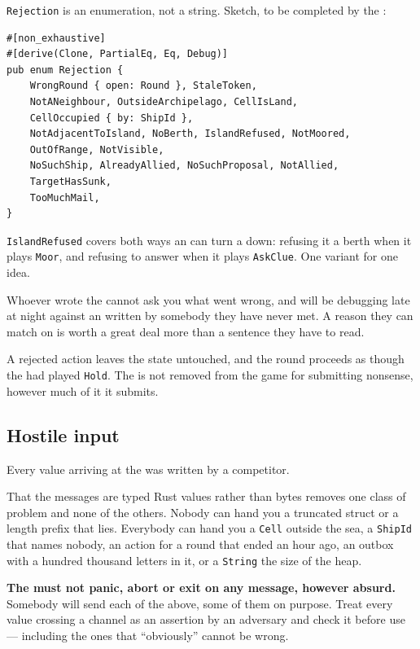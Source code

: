 \documentclass{article}
\begin{document}
\texttt{Rejection} is an enumeration, not a string. Sketch, to be completed by the \WG:

\begin{lstlisting}
#[non_exhaustive]
#[derive(Clone, PartialEq, Eq, Debug)]
pub enum Rejection {
    WrongRound { open: Round }, StaleToken,
    NotANeighbour, OutsideArchipelago, CellIsLand,
    CellOccupied { by: ShipId },
    NotAdjacentToIsland, NoBerth, IslandRefused, NotMoored,
    OutOfRange, NotVisible,
    NoSuchShip, AlreadyAllied, NoSuchProposal, NotAllied,
    TargetHasSunk,
    TooMuchMail,
}
\end{lstlisting}

\texttt{IslandRefused} covers both ways an \island{} can turn a \ship{} down: refusing it a berth
when it plays \texttt{Moor}, and refusing to answer when it plays \texttt{AskClue}. One variant
for one idea.

Whoever wrote the \ship{} cannot ask you what went wrong, and will be debugging late at night
against an \admiralty{} written by somebody they have never met. A reason they can match on is
worth a great deal more than a sentence they have to read.

A rejected action leaves the state untouched, and the round proceeds as though the \ship{} had
played \texttt{Hold}. The \ship{} is not removed from the game for submitting nonsense, however
much of it it submits.

\subsection{Hostile input}

Every value arriving at the \admiralty{} was written by a competitor.

That the messages are typed Rust values rather than bytes removes one class of problem and none of
the others. Nobody can hand you a truncated struct or a length prefix that lies. Everybody can hand
you a \texttt{Cell} outside the sea, a \texttt{ShipId} that names nobody, an action for a round
that ended an hour ago, an outbox with a hundred thousand letters in it, or a \texttt{String} the
size of the heap.

\textbf{The \admiralty{} must not panic, abort or exit on any message, however absurd.} Somebody
will send each of the above, some of them on purpose. Treat every value crossing a channel as an
assertion by an adversary and check it before use --- including the ones that ``obviously'' cannot
be wrong.
\end{document}
